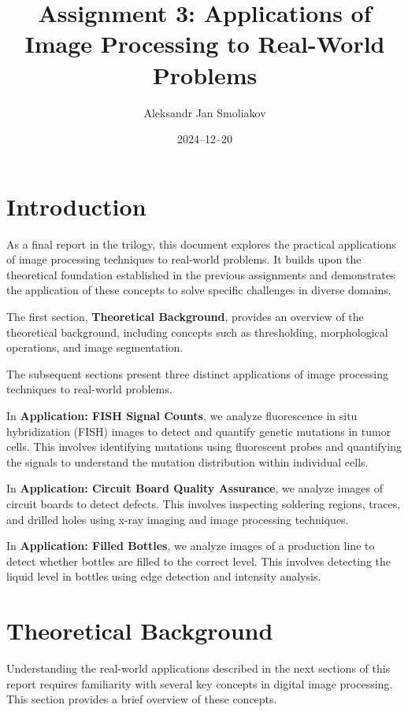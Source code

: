 \documentclass[a4paper,12pt]{article}
\title{Assignment 3: Applications of Image Processing to Real-World Problems}
\author{Aleksandr Jan Smoliakov}
\date{2024--12--20}
\begin{document}
\maketitle

\section{Introduction}

As a final report in the trilogy, this document explores the practical applications of image processing techniques to real-world problems. It builds upon the theoretical foundation established in the previous assignments and demonstrates the application of these concepts to solve specific challenges in diverse domains.

The first section, \textbf{Theoretical Background}, provides an overview of the theoretical background, including concepts such as thresholding, morphological operations, and image segmentation.

The subsequent sections present three distinct applications of image processing techniques to real-world problems.

In \textbf{Application: FISH Signal Counts}, we analyze fluorescence in situ hybridization (FISH) images to detect and quantify genetic mutations in tumor cells. This involves identifying mutations using fluorescent probes and quantifying the signals to understand the mutation distribution within individual cells.

In \textbf{Application: Circuit Board Quality Assurance}, we analyze images of circuit boards to detect defects. This involves inspecting soldering regions, traces, and drilled holes using x-ray imaging and image processing techniques.

In \textbf{Application: Filled Bottles}, we analyze images of a production line to detect whether bottles are filled to the correct level. This involves detecting the liquid level in bottles using edge detection and intensity analysis.

\newpage

\tableofcontents

\newpage

\section{Theoretical Background}

Understanding the real-world applications described in the next sections of this report requires familiarity with several key concepts in digital image processing. This section provides a brief overview of these concepts.
\end{document}
